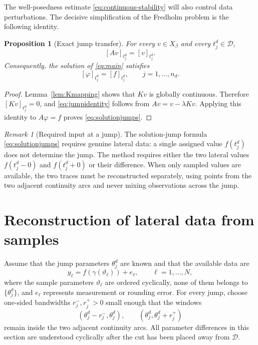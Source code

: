 \documentclass[11pt,a4paper]{amsart}
\theoremstyle{plain}
\newtheorem{proposition}[theorem]{Proposition}
\theoremstyle{definition}
\theoremstyle{remark}
\newtheorem{remark}[theorem]{Remark}
\newcommand{\D}{\mathcal D}
\begin{document}
The well-posedness estimate \eqref{eq:continuous-stability} will also control data perturbations.  The decisive simplification of the Fredholm problem is the following identity.

\begin{proposition}[Exact jump transfer]\label{prop:jumpidentity}
For every $v\in X_\beta$ and every $t_j^d\in\D$,
\begin{equation}\label{eq:jumpidentity}
        [Av]_{t_j^d}=[v]_{t_j^d}.
\end{equation}
Consequently, the solution of \eqref{eq:main} satisfies
\begin{equation}\label{eq:solutionjumps}
        [\varphi]_{t_j^d}=[f]_{t_j^d},
        \qquad j=1,\ldots,n_d.
\end{equation}
\end{proposition}

\begin{proof}
Lemma~\ref{lem:Kmapping} shows that $Kv$ is globally continuous.  Therefore $[Kv]_{t_j^d}=0$, and \eqref{eq:jumpidentity} follows from $Av=v-\lambda Kv$.  Applying this identity to $A\varphi=f$ proves \eqref{eq:solutionjumps}.
\end{proof}

\begin{remark}[Required input at a jump]\label{rem:jumpdata}
The solution-jump formula \eqref{eq:solutionjumps} requires genuine lateral data: a single assigned value $f(t_j^d)$ does not determine the jump.  The method requires either the two lateral values $f(t_j^d-0)$ and $f(t_j^d+0)$ or their difference.  When only sampled values are available, the two traces must be reconstructed separately, using points from the two adjacent continuity arcs and never mixing observations across the jump.
\end{remark}

\section{Reconstruction of lateral data from samples}\label{sec:lateral}

Assume that the jump parameters $\theta_j^d$ are known and that the available data are
\begin{equation}\label{eq:samples}
        y_\ell=f(\gamma(\vartheta_\ell))+e_\ell,
        \qquad \ell=1,\ldots,N,
\end{equation}
where the sample parameters $\vartheta_\ell$ are ordered cyclically, none of them belongs to $\{\theta_j^d\}$, and $e_\ell$ represents measurement or rounding error.  For every jump, choose one-sided bandwidths $r_j^-,r_j^+>0$ small enough that the windows
\[
 (\theta_j^d-r_j^-,\theta_j^d),
 \qquad
 (\theta_j^d,\theta_j^d+r_j^+)
\]
remain inside the two adjacent continuity arcs.  All parameter differences in this section are understood cyclically after the cut has been placed away from $\D$.
\end{document}
